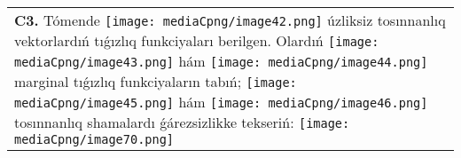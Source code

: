 \documentclass{article}
\begin{document}
\begin{tabular}{m{17cm}}
 \\
\textbf{C3.} Tómende \texttt{[image: mediaCpng/image42.png]} úzliksiz tosınnanlıq vektorlardıń tıǵızlıq funkciyaları berilgen. Olardıń \texttt{[image: mediaCpng/image43.png]} hám \texttt{[image: mediaCpng/image44.png]} marginal tıǵızlıq funkciyaların tabıń; \texttt{[image: mediaCpng/image45.png]} hám \texttt{[image: mediaCpng/image46.png]} tosınnanlıq shamalardı ǵárezsizlikke tekseriń: \texttt{[image: mediaCpng/image70.png]}
 \\

\end{tabular}
\vspace{1cm}
\end{document}
